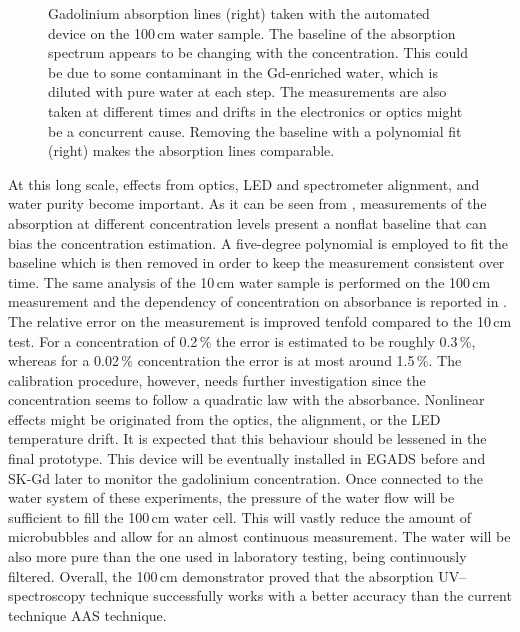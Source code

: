\begin{figure}
	\centering
	\resizebox{\linewidth}{!}{}
	\caption[Gadolinium absorption spectrum of the 100\,cm water sample]%
		{Gadolinium absorption lines (right) taken with the automated device on the 100\,cm water sample.
		The baseline of the absorption spectrum appears to be changing with the concentration.
		This could be due to some contaminant in the Gd-enriched water, which is diluted with pure water %
		at each step.
		The measurements are also taken at different times and drifts in the electronics or optics might be a %
		concurrent cause.
		Removing the baseline with a polynomial fit (right) makes the absorption lines comparable.}
	\label{fig:gad_fit}
\end{figure}

At this long scale, effects from optics, LED and spectrometer alignment, and water purity become important.
As it can be seen from , measurements of the absorption at different concentration levels %
present a nonflat baseline that can bias the concentration estimation.
A five-degree polynomial is employed to fit the baseline which is then removed in order to keep the measurement consistent over time.
The same analysis of the 10\,cm water sample is performed on the 100\,cm measurement %
and the dependency of concentration on absorbance is reported in .
The relative error on the measurement is improved tenfold compared to the 10\,cm test.
For a concentration of 0.2\,\% the error is estimated to be roughly 0.3\,\%, %
whereas for a 0.02\,\% concentration the error is at most around 1.5\,\%.
The calibration procedure, however, needs further investigation since %
the concentration seems to follow a quadratic law with the absorbance.
Nonlinear effects might be originated from the optics, the alignment, or the LED temperature drift.
It is expected that this behaviour should be lessened in the final prototype.
This device will be eventually installed in EGADS before and SK-Gd later to monitor the gadolinium concentration.
Once connected to the water system of these experiments, the pressure of the water flow will %
be sufficient to fill the 100\,cm water cell.
This will vastly reduce the amount of microbubbles and allow for an almost continuous measurement.
The water will be also more pure than the one used in laboratory testing, being continuously filtered.
Overall, the 100\,cm demonstrator proved that the absorption UV--spectroscopy technique successfully works %
with a better accuracy than the current technique AAS technique.



